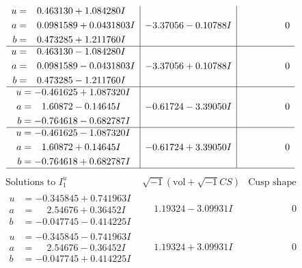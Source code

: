 \documentclass[1p]{elsarticle_modified}
\theoremstyle{definition}
\newcommand{\I}{\sqrt{-1}}
\begin{document}
$$\begin{array}{c|c|c}
\begin{aligned}
u &= \phantom{-}0.463130 + 1.084280 I \\
a &= \phantom{-}0.0981589 + 0.0431803 I \\
b &= \phantom{-}0.473285 + 1.211760 I\end{aligned}
 & -3.37056 - 0.10788 I & \phantom{-0.000000 } 0 \\ \hline\begin{aligned}
u &= \phantom{-}0.463130 - 1.084280 I \\
a &= \phantom{-}0.0981589 - 0.0431803 I \\
b &= \phantom{-}0.473285 - 1.211760 I\end{aligned}
 & -3.37056 + 0.10788 I & \phantom{-0.000000 } 0 \\ \hline\begin{aligned}
u &= -0.461625 + 1.087320 I \\
a &= \phantom{-}1.60872 - 0.14645 I \\
b &= -0.764618 - 0.682787 I\end{aligned}
 & -0.61724 - 3.39050 I & \phantom{-0.000000 } 0 \\ \hline\begin{aligned}
u &= -0.461625 - 1.087320 I \\
a &= \phantom{-}1.60872 + 0.14645 I \\
b &= -0.764618 + 0.682787 I\end{aligned}
 & -0.61724 + 3.39050 I & \phantom{-0.000000 } 0\\
 \hline 
 \end{array}$$\newpage$$\begin{array}{c|c|c}  
\text{Solutions to }I^u_{1}& \I (\text{vol} + \sqrt{-1}CS) & \text{Cusp shape}\\
 \hline 
\begin{aligned}
u &= -0.345845 + 0.741963 I \\
a &= \phantom{-}2.54676 + 0.36452 I \\
b &= -0.047745 - 0.414225 I\end{aligned}
 & \phantom{-}1.19324 - 3.09931 I & \phantom{-0.000000 } 0 \\ \hline\begin{aligned}
u &= -0.345845 - 0.741963 I \\
a &= \phantom{-}2.54676 - 0.36452 I \\
b &= -0.047745 + 0.414225 I\end{aligned}
 & \phantom{-}1.19324 + 3.09931 I & \phantom{-0.000000 } 0 \\ \hline\begin{aligned}

\end{aligned}
\end{array}$$
\end{document}

